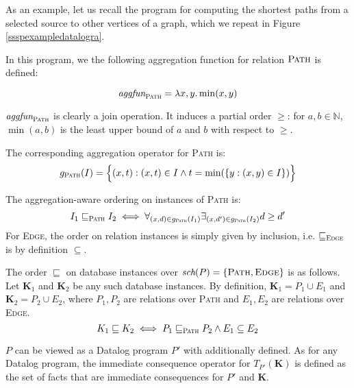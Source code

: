 \begin{exmp}
As an example, let us recall the program for computing the shortest paths from a selected source to other vertices of a graph, which we repeat in Figure \ref{ssspexampledatalogra}.



In this program, we the following aggregation function for relation $\textsc{Path}$ is defined:

$$ \textit{aggfun}_\textsc{Path} = \lambda x, y. \min(x, y) $$

$\textit{aggfun}_\textsc{Path}$ is clearly a join operation. It induces a partial order $\ge$: for $a, b \in \mathbb{N}$, $\min(a, b)$ is the least upper bound of $a$ and $b$ with respect to $\ge$.

The corresponding aggregation operator for \textsc{Path} is:
$$g_\textsc{Path}(I) = \Big\{(x, t): (x, t) \in I \wedge t = \min(\{y: (x, y) \in I\})\Big\} $$

The aggregation-aware ordering on instances of \textsc{Path} is:
$$ I_1 \sqsubseteq_\textsc{Path} I_2 \iff \forall_{(x, d) \in g_\textsc{Path}(I_1)} \exists_{(x, d') \in g_\textsc{Path}(I_2)} d \ge d' $$
For \textsc{Edge}, the order on relation instances is simply given by inclusion, i.e. $\sqsubseteq_\textsc{Edge}$ is by definition $\subseteq$.

The order $\sqsubseteq$ on database instances over $\textit{sch}(P) = \{\textsc{Path}, \textsc{Edge}\}$ is as follows. Let \textbf{K}$_1$ and \textbf{K}$_2$ be any such database instances. By definition, $\textbf{K}_1 = P_1 \cup E_1$ and $\textbf{K}_2 = P_2 \cup E_2$, where $P_1, P_2$ are relations over \textsc{Path} and $E_1, E_2$ are relations over \textsc{Edge}.
$$ K_1 \sqsubseteq K_2 \iff P_1 \sqsubseteq_\textsc{Path} P_2 \wedge E_1 \subseteq E_2 $$

$P$ can be viewed as a Datalog program $P'$ with \aggfun additionally defined. As for any Datalog program, the immediate consequence operator for $T_{P'}(\textbf{K})$ is defined as the set of facts that are immediate consequences for $P'$ and \textbf{K}.


\end{exmp}

